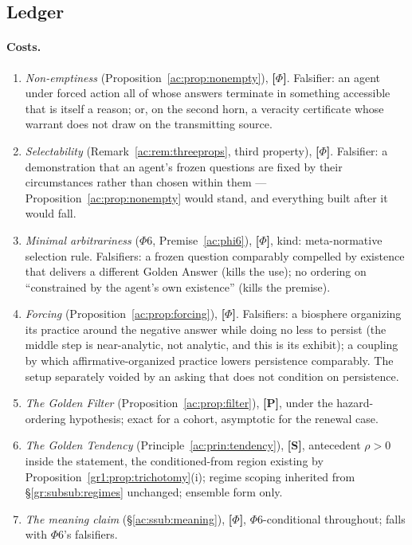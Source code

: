 \documentclass[11pt]{article}
\numberwithin{equation}{section}
\theoremstyle{plain}
\theoremstyle{definition}
\theoremstyle{remark}
\begin{document}
\subsection{Ledger}\label{ac:sub:ledger}

\paragraph{Costs.}
\begin{enumerate}
    \item \emph{Non-emptiness} (Proposition~\ref{ac:prop:nonempty}), \textbf{[$\Phi$]}. Falsifier: an agent under forced action all of whose answers terminate in something accessible that is itself a reason; or, on the second horn, a veracity certificate whose warrant does not draw on the transmitting source.
    \item \emph{Selectability} (Remark~\ref{ac:rem:threeprops}, third property), \textbf{[$\Phi$]}. Falsifier: a demonstration that an agent's frozen questions are fixed by their circumstances rather than chosen within them --- Proposition~\ref{ac:prop:nonempty} would stand, and everything built after it would fall.
    \item \emph{Minimal arbitrariness} ($\Phi6$, Premise~\ref{ac:phi6}), \textbf{[$\Phi$]}, kind: meta-normative selection rule. Falsifiers: a frozen question comparably compelled by existence that delivers a different Golden Answer (kills the use); no ordering on ``constrained by the agent's own existence'' (kills the premise).
    \item \emph{Forcing} (Proposition~\ref{ac:prop:forcing}), \textbf{[$\Phi$]}. Falsifiers: a biosphere organizing its practice around the negative answer while doing no less to persist (the middle step is near-analytic, not analytic, and this is its exhibit); a coupling by which affirmative-organized practice lowers persistence comparably. The setup separately voided by an asking that does not condition on persistence.
    \item \emph{The Golden Filter} (Proposition~\ref{ac:prop:filter}), \textbf{[P]}, under the hazard-ordering hypothesis; exact for a cohort, asymptotic for the renewal case.
    \item \emph{The Golden Tendency} (Principle~\ref{ac:prin:tendency}), \textbf{[S]}, antecedent $\rho > 0$ inside the statement, the conditioned-from region existing by Proposition~\ref{gr1:prop:trichotomy}(i); regime scoping inherited from \S\ref{gr:subsub:regimes} unchanged; ensemble form only.
    \item \emph{The meaning claim} (\S\ref{ac:ssub:meaning}), \textbf{[$\Phi$]}, $\Phi6$-conditional throughout; falls with $\Phi6$'s falsifiers.

\end{enumerate}
\end{document}
